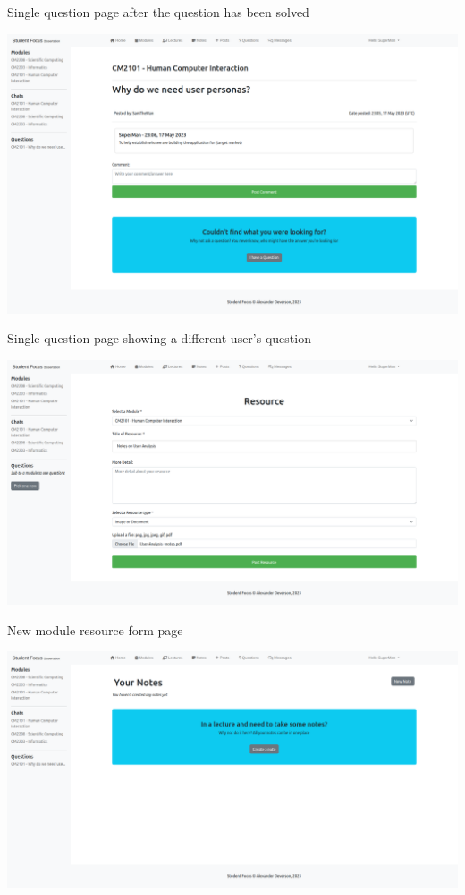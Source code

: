 Single question page after the question has been solved

\includegraphics[scale=0.20]{images/application/13 - other users question.png}

Single question page showing a different user's question

\includegraphics[scale=0.20]{images/application/14 - student resource.png}

New module resource form page

\includegraphics[scale=0.20]{images/application/15 - notes_blank.png}

